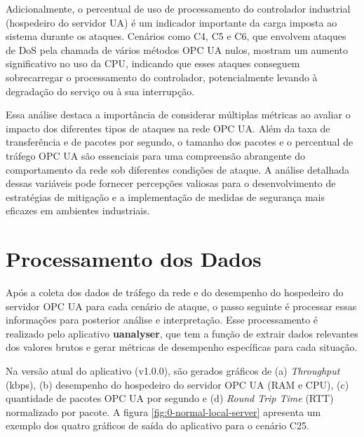     Adicionalmente, o percentual de uso de processamento do controlador industrial (hospedeiro do servidor UA) é um indicador importante da carga imposta ao sistema durante os ataques. Cenários como C4, C5 e C6, que envolvem ataques de DoS pela chamada de vários métodos OPC UA nulos, mostram um aumento significativo no uso da CPU, indicando que esses ataques conseguem sobrecarregar o processamento do controlador, potencialmente levando à degradação do serviço ou à sua interrupção.

    Essa análise destaca a importância de considerar múltiplas métricas ao avaliar o impacto dos diferentes tipos de ataques na rede OPC UA. Além da taxa de transferência e de pacotes por segundo, o tamanho dos pacotes e o percentual de tráfego OPC UA são essenciais para uma compreensão abrangente do comportamento da rede sob diferentes condições de ataque. A análise detalhada dessas variáveis pode fornecer percepções valiosas para o desenvolvimento de estratégias de mitigação e a implementação de medidas de segurança mais eficazes em ambientes industriais.

\section{Processamento dos Dados} \label{sec:processamento-dados}

    Após a coleta dos dados de tráfego da rede e do desempenho do hospedeiro do servidor OPC UA para cada cenário de ataque, o passo seguinte é processar essas informações para posterior análise e interpretação. Esse processamento é realizado pelo aplicativo \textbf{uanalyser}, que tem a função de extrair dados relevantes dos valores brutos e gerar métricas de desempenho específicas para cada situação.

    Na versão atual do aplicativo (v1.0.0), são gerados gráficos de (a) \textit{Throughput} (kbps), (b) desempenho do hospedeiro do servidor OPC UA (RAM e CPU), (c) quantidade de pacotes OPC UA por segundo e (d) \textit{Round Trip Time} (RTT) normalizado por pacote. A figura \autoref{fig:0-normal-local-server} apresenta um exemplo dos quatro gráficos de saída do aplicativo para o cenário C25.

